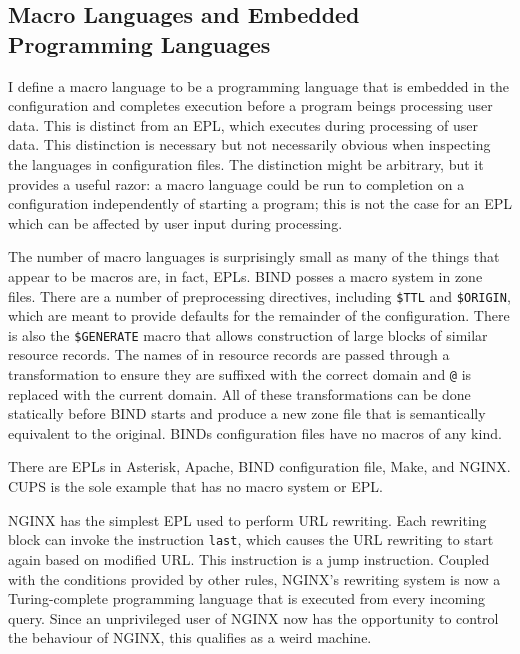 \documentclass[letterpaper,twocolumn,10pt]{article}
\begin{document}
\subsection{Macro Languages and Embedded Programming Languages}
I define a macro language to be a programming language that is embedded in the configuration and completes execution before a program beings processing user data. This is distinct from an EPL, which executes during processing of user data. This distinction is necessary but not necessarily obvious when inspecting the languages in configuration files. The distinction might be arbitrary, but it provides a useful razor: a macro language could be run to completion on a configuration independently of starting a program; this is not the case for an EPL which can be affected by user input during processing.

The number of macro languages is surprisingly small as many of the things that appear to be macros are, in fact, EPLs. BIND posses a macro system in zone files. There are a number of preprocessing directives, including \texttt{\$TTL} and \texttt{\$ORIGIN}, which are meant to provide defaults for the remainder of the configuration. There is also the \texttt{\$GENERATE} macro that allows construction of large blocks of similar resource records. The names of in resource records are passed through a transformation to ensure they are suffixed with the correct domain and \texttt{@} is replaced with the current domain. All of these transformations can be done statically before BIND starts and produce a new zone file that is semantically equivalent to the original. BINDs configuration files have no macros of any kind.

There are EPLs in Asterisk, Apache, BIND configuration file, Make, and NGINX. CUPS is the sole example that has no macro system or EPL.

NGINX has the simplest EPL used to perform URL rewriting. Each rewriting block can invoke the instruction \texttt{last}, which causes the URL rewriting to start again based on modified URL. This instruction is a jump instruction. Coupled with the conditions provided by other rules, NGINX's rewriting system is now a Turing-complete programming language that is executed from every incoming query. Since an unprivileged user of NGINX now has the opportunity to control the behaviour of NGINX, this qualifies as a weird machine.
\end{document}
